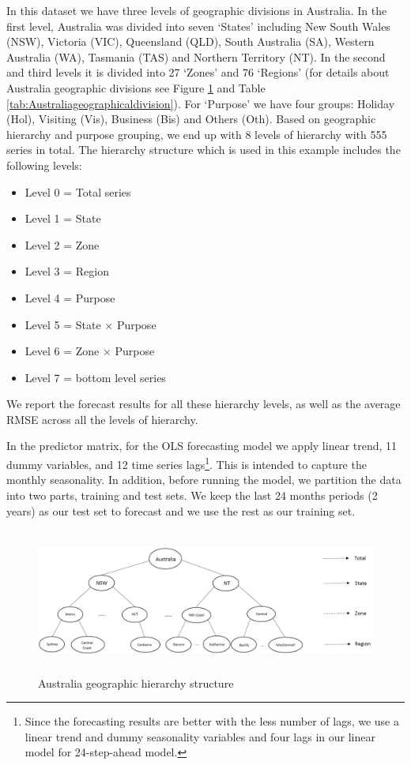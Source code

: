 \documentclass[11pt,a4paper,]{article}
\providecommand{\tightlist}{%
  \setlength{\itemsep}{0pt}\setlength{\parskip}{0pt}}
\begin{document}
In this dataset we have three levels of geographic divisions in
Australia. In the first level, Australia was divided into seven `States'
including New South Wales (NSW), Victoria (VIC), Queensland (QLD), South
Australia (SA), Western Australia (WA), Tasmania (TAS) and Northern
Territory (NT). In the second and third levels it is divided into 27
`Zones' and 76 `Regions' (for details about Australia geographic
divisions see Figure \ref{fig:Australiahierarchystructure} and Table
\ref{tab:Australiageographicaldivision}). For `Purpose' we have four
groups: Holiday (Hol), Visiting (Vis), Business (Bis) and Others (Oth).
Based on geographic hierarchy and purpose grouping, we end up with 8
levels of hierarchy with 555 series in total. The hierarchy structure
which is used in this example includes the following levels:

\begin{itemize}
\tightlist
\item
  Level 0 = Total series
\item
  Level 1 = State
\item
  Level 2 = Zone
\item
  Level 3 = Region
\item
  Level 4 = Purpose
\item
  Level 5 = State \(\times\) Purpose
\item
  Level 6 = Zone \(\times\) Purpose
\item
  Level 7 = bottom level series
\end{itemize}

We report the forecast results for all these hierarchy levels, as well
as the average RMSE across all the levels of hierarchy.

In the predictor matrix, for the OLS forecasting model we apply linear
trend, 11 dummy variables, and 12 time series lags\footnote{Since the
  forecasting results are better with the less number of lags, we use a
  linear trend and dummy seasonality variables and four lags in our
  linear model for 24-step-ahead model.}. This is intended to capture
the monthly seasonality. In addition, before running the model, we
partition the data into two parts, training and test sets. We keep the
last 24 months periods (2 years) as our test set to forecast and we use
the rest as our training set.

\begin{figure}

{\centering \includegraphics[width=450px,height=180px]{Paper-Figures/Australian_hierarchy_structure} 

}

\caption{Australia geographic hierarchy structure}\label{fig:Australiahierarchystructure}
\end{figure}
\end{document}
